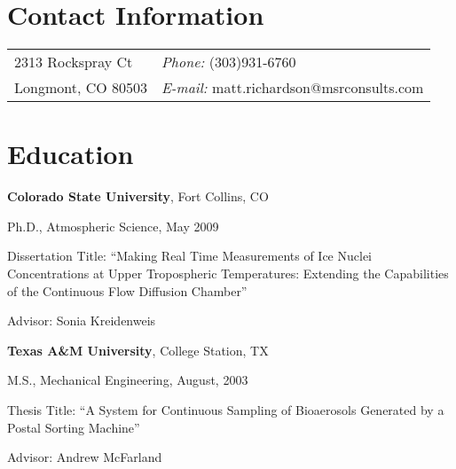 \documentclass[margin,line]{res}
\newenvironment{list1}{
  \begin{list}{\ding{113}}{%
      \setlength{\itemsep}{0in}
      \setlength{\parsep}{0in} \setlength{\parskip}{0in}
      \setlength{\topsep}{0in} \setlength{\partopsep}{0in} 
      \setlength{\leftmargin}{0.17in}}}{\end{list}}
\begin{document}

\begin{resume}
\section{\sc Contact Information}
\vspace{.05in}
\begin{tabular}{@{}p{2in}p{4in}}
2313 Rockspray Ct             & {\it Phone:}  (303)931-6760 \\            
Longmont, CO 80503  & {\it E-mail:}    matt.richardson@msrconsults.com \\      
\end{tabular}

\section{\sc Education}
{\bf Colorado State University}, Fort Collins, CO\\
\vspace*{-.1in}
\begin{list1}
\item[] Ph.D., Atmospheric Science, May 2009
\vspace*{.05in}
\item[] Dissertation Title:  ``Making Real Time Measurements of Ice Nuclei Concentrations at Upper Tropospheric Temperatures: Extending the Capabilities of the Continuous Flow Diffusion Chamber'' 
\item[] Advisor:  Sonia Kreidenweis
\end{list1}

{\bf Texas A\&M University}, College Station, TX\\
\vspace*{-.1in}
\begin{list1}
\item[] M.S., Mechanical Engineering,  August, 2003
\vspace*{0.05in}
\item[] Thesis Title: ``A System for Continuous Sampling of Bioaerosols Generated by a Postal Sorting Machine''
\item[] Advisor: Andrew McFarland
\end{list1}


\end{resume}
\end{document}
